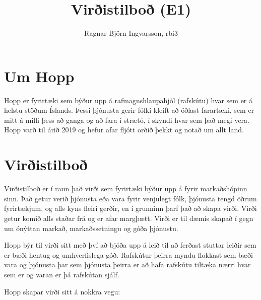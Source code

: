 \documentclass{article}
\title{Virðistilboð (E1)}
\author{Ragnar Björn Ingvarsson, rbi3}
\begin{document}
	
	\maketitle
	
	\section*{Um Hopp}

	Hopp er fyrirtæki sem býður upp á rafmagnshlaupahjól (rafskútu) hvar sem er  
	á helstu stöðum Íslands. Þessi þjónusta gerir fólki kleift að öðlast 
	farartæki, sem er mitt á milli þess að ganga og að fara í strætó, 
	í skyndi hvar sem það megi vera. Hopp varð til árið 2019 og hefur 
	afar fljótt orðið þekkt og notað um allt land.

	\section*{Virðistilboð}

	Virðistilboð er í raun það virði sem fyrirtæki býður upp á fyrir 
	markaðshópinn sinn. Það getur verið þjónusta eða vara fyrir venjulegt fólk, 
	þjónusta tengd öðrum fyrirtækjum, og alls kyns fleiri gerðir, en í 
	grunninn þarf það að skapa virði. Virði getur komið alls staðar frá og
	er afar margþætt. Virði er til dæmis skapað í gegn um ónýttan markað, 
	markaðssetningu og góða þjónustu.

	Hopp býr til virði sitt með því að bjóða upp á leið til að ferðast 
	stuttar leiðir sem er bæði hentug og umhverfislega góð. Rafskútur 
	þeirra myndu flokkast sem bæði vara og þjónusta þar sem þjónusta þeirra er að hafa rafskútu 
	tiltæka nærri hvar sem er og varan er þá rafskútan sjálf. 

	\vspace{3mm}

	Hopp skapar virði sitt á nokkra vegu:

	\vspace{3mm}
\end{document}

